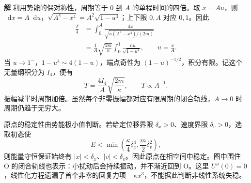 \documentclass[11pt,openany,fontset=fandol]{ctexbook}
\theoremstyle{definition}\newtheorem{example}{例}[chapter]\newtheorem{exercise}{习题}[chapter]
\newcommand{\SolutionStart}{\par\medskip\ifdim\pagetotal>0pt\ifdim\dimexpr\pagegoal-\pagetotal\relax<3\baselineskip\newpage\fi\fi\noindent\textbf{解}\quad\ignorespaces}
\newenvironment{solution}{\SolutionStart}{\par\medskip}
\newcommand{\dd}{\mathop{}\!\mathrm d}\newcommand{\ee}{\mathrm e}\newcommand{\vct}[1]{\bm{#1}}
\begin{document}
\begin{solution}
利用势能的偶对称性，周期等于 $0$ 到 $A$ 的单程时间的四倍。取 $x=Au$，则 $\dd x=A\dd u$，$\sqrt{A^4-x^4}=A^2\sqrt{1-u^4}$；上下限 $0,A$ 对应 $0,1$。因此
\begin{align*}
\frac T4
&=\int_0^A\frac{\dd x}{\sqrt{\kappa(A^4-x^4)/(2m)}}\\
&=\frac1A\sqrt{\frac{2m}{\kappa}}
\int_0^1\frac{\dd u}{\sqrt{1-u^4}},\qquad u=\frac xA.
\end{align*}
当 $u\to1^-$，$1-u^4\sim4(1-u)$，端点奇性为 $(1-u)^{-1/2}$，积分有限。记这个无量纲积分为 $I_4$，便有
\[
T=\frac{4I_4}{A}\sqrt{\frac{2m}{\kappa}},\qquad T\propto A^{-1}.
\]
振幅减半时周期加倍。虽然每个非零振幅都对应有限周期的闭合轨线，$A\to0$ 时周期仍趋于无穷大。

原点的稳定性由势能极小值判断。若给定位移界限 $\delta_x>0$、速度界限 $\delta_v>0$，选取初态使
\[
E<\min\left(\frac\kappa4\delta_x^4,\frac m2\delta_v^2\right),
\]
则能量守恒保证始终有 $|x|<\delta_x$、$|v|<\delta_v$。因此原点在相空间中稳定。图中围住 O 的闭合轨线也表示：小扰动后会持续振动，并不渐近回到 O。这里 $U''(0)=0$，线性化方程遗漏了首个非零的回复力项 $-\kappa x^3$，不能据此判断非线性系统失稳。
\end{solution}
\end{document}
